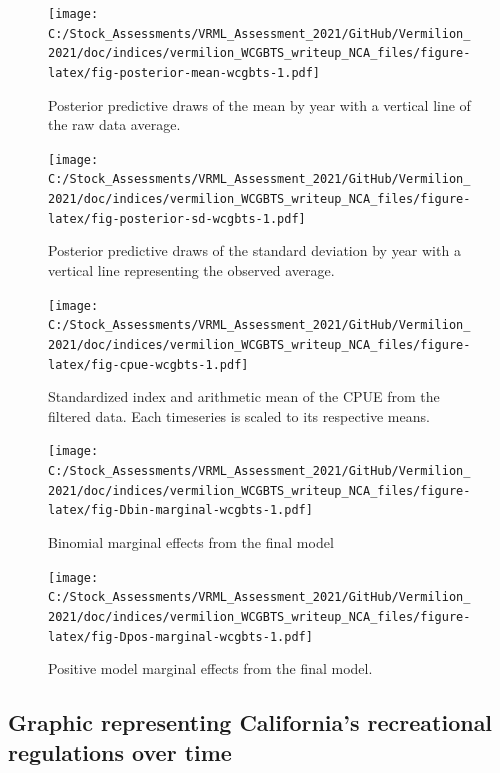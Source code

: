 \documentclass[
  english,
  a4paper,
]{article}
\begin{document}
\begin{figure}
\centering
\texttt{[image: C:/Stock\_Assessments/VRML\_Assessment\_2021/GitHub/Vermilion\_2021/doc/indices/vermilion\_WCGBTS\_writeup\_NCA\_files/figure-latex/fig-posterior-mean-wcgbts-1.pdf]}
\caption{\label{fig:fig-posterior-mean-wcgbts}Posterior predictive draws of the mean by year with a vertical line of the raw data average.}
\end{figure}

\begin{figure}
\centering
\texttt{[image: C:/Stock\_Assessments/VRML\_Assessment\_2021/GitHub/Vermilion\_2021/doc/indices/vermilion\_WCGBTS\_writeup\_NCA\_files/figure-latex/fig-posterior-sd-wcgbts-1.pdf]}
\caption{\label{fig:fig-posterior-sd-wcgbts}Posterior predictive draws of the standard deviation by year with a vertical line representing the observed average.}
\end{figure}

\begin{figure}
\centering
\texttt{[image: C:/Stock\_Assessments/VRML\_Assessment\_2021/GitHub/Vermilion\_2021/doc/indices/vermilion\_WCGBTS\_writeup\_NCA\_files/figure-latex/fig-cpue-wcgbts-1.pdf]}
\caption{\label{fig:fig-cpue-wcgbts}Standardized index and arithmetic mean of the CPUE from the filtered data. Each timeseries is scaled to its respective means.}
\end{figure}

\begin{figure}
\centering
\texttt{[image: C:/Stock\_Assessments/VRML\_Assessment\_2021/GitHub/Vermilion\_2021/doc/indices/vermilion\_WCGBTS\_writeup\_NCA\_files/figure-latex/fig-Dbin-marginal-wcgbts-1.pdf]}
\caption{\label{fig:fig-Dbin-marginal-wcgbts}Binomial marginal effects from the final model}
\end{figure}

\begin{figure}
\centering
\texttt{[image: C:/Stock\_Assessments/VRML\_Assessment\_2021/GitHub/Vermilion\_2021/doc/indices/vermilion\_WCGBTS\_writeup\_NCA\_files/figure-latex/fig-Dpos-marginal-wcgbts-1.pdf]}
\caption{\label{fig:fig-Dpos-marginal-wcgbts}Positive model marginal effects from the final model.}
\end{figure}

\clearpage

\hypertarget{graphic-representing-californias-recreational-regulations-over-time}{%
\subsection{Graphic representing California's recreational regulations over time}\label{graphic-representing-californias-recreational-regulations-over-time}}
\end{document}
